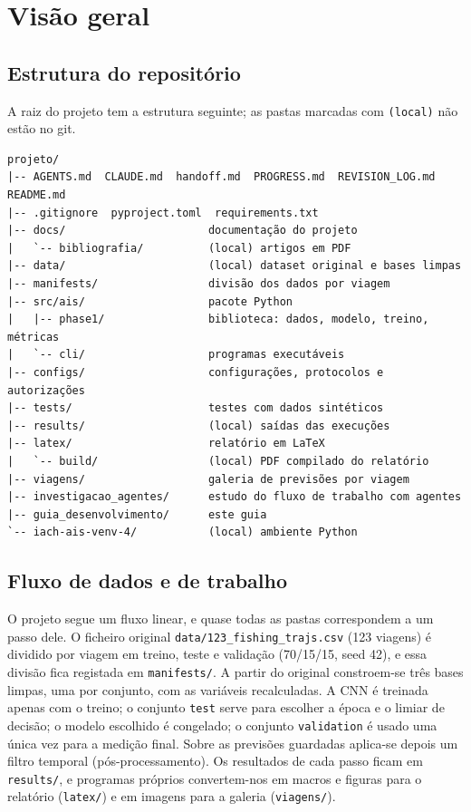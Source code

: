 \documentclass[11pt,a4paper]{article}
\newcommand{\f}[1]{\texttt{#1}}
\begin{document}
\section{Visão geral}\label{sec:visao}

\subsection{Estrutura do repositório}

A raiz do projeto tem a estrutura seguinte; as pastas marcadas com \f{(local)} não estão no git.

\begin{lstlisting}
projeto/
|-- AGENTS.md  CLAUDE.md  handoff.md  PROGRESS.md  REVISION_LOG.md  README.md
|-- .gitignore  pyproject.toml  requirements.txt
|-- docs/                      documentação do projeto
|   `-- bibliografia/          (local) artigos em PDF
|-- data/                      (local) dataset original e bases limpas
|-- manifests/                 divisão dos dados por viagem
|-- src/ais/                   pacote Python
|   |-- phase1/                biblioteca: dados, modelo, treino, métricas
|   `-- cli/                   programas executáveis
|-- configs/                   configurações, protocolos e autorizações
|-- tests/                     testes com dados sintéticos
|-- results/                   (local) saídas das execuções
|-- latex/                     relatório em LaTeX
|   `-- build/                 (local) PDF compilado do relatório
|-- viagens/                   galeria de previsões por viagem
|-- investigacao_agentes/      estudo do fluxo de trabalho com agentes
|-- guia_desenvolvimento/      este guia
`-- iach-ais-venv-4/           (local) ambiente Python
\end{lstlisting}

\subsection{Fluxo de dados e de trabalho}

O projeto segue um fluxo linear, e quase todas as pastas correspondem a um passo dele. O ficheiro
original \f{data/123\_fishing\_trajs.csv} (123 viagens) é dividido por viagem em treino, teste e
validação (70/15/15, seed 42), e essa divisão fica registada em \f{manifests/}. A partir do original
constroem-se três bases limpas, uma por conjunto, com as variáveis recalculadas. A CNN é treinada
apenas com o treino; o conjunto \f{test} serve para escolher a época e o limiar de decisão; o modelo
escolhido é congelado; o conjunto \f{validation} é usado uma única vez para a medição final. Sobre
as previsões guardadas aplica-se depois um filtro temporal (pós-processamento). Os resultados de
cada passo ficam em \f{results/}, e programas próprios convertem-nos em macros e figuras para o
relatório (\f{latex/}) e em imagens para a galeria (\f{viagens/}).
\end{document}
